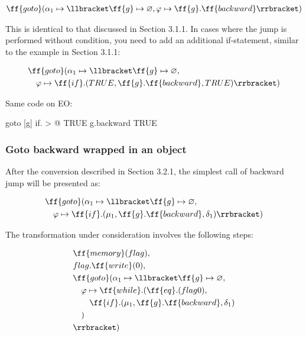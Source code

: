 \documentclass[sigplan,review,11pt,nonacm,natbib=false]{acmart}
\begin{document}
\begin{equation}
\begin{split}
& \ff{goto}(\alpha_1 \mapsto \llbracket \ff{g} \mapsto \varnothing, \varphi \mapsto \ff{g}.\ff{backward} \rrbracket ) \\
\end{split}
\end{equation}

This is identical to that discussed in Section 3.1.1. In cases where the jump is performed without condition, you need to add an additional if-statement, similar to the example in Section 3.1.1:

\begin{equation}
\begin{split}
& \ff{goto}(\alpha_1 \mapsto \llbracket \ff{g} \mapsto \varnothing, \\
& \quad \varphi \mapsto \ff{if}.( TRUE, \ff{g}.\ff{backward}, TRUE ) \rrbracket) \\
\end{split}
\end{equation}

Same code on EO:

\begin{ffcode}
goto
  [g]
    if. > @
      TRUE
      g.backward
      TRUE
\end{ffcode}

\subsubsection{Goto backward wrapped in an object}
After the conversion described in Section 3.2.1, the simplest call of backward jump will be presented as:

\begin{equation}
\begin{split}
& \ff{goto}(\alpha_1 \mapsto \llbracket \ff{g} \mapsto \varnothing, \\
& \quad \varphi \mapsto \ff{if}.( \mu_1, \ff{g}.\ff{backward}, \delta_1 ) \rrbracket) \\
\end{split}
\end{equation}

The transformation under consideration involves the following steps:

\begin{equation}
\begin{split}
& \ff{memory}(flag), \\
& flag.\ff{write}(0), \\
& \ff{goto}(\alpha_1 \mapsto \llbracket \ff{g} \mapsto \varnothing, \\
& \quad \varphi \mapsto \ff{while}.(\ff{eq}.(flag 0), \\
& \quad \quad \ff{if}.( \mu_1, \ff{g}.\ff{backward}, \delta_1 ) \\
& \quad ) \\
& \rrbracket) \\
\end{split}
\end{equation}
\end{document}
